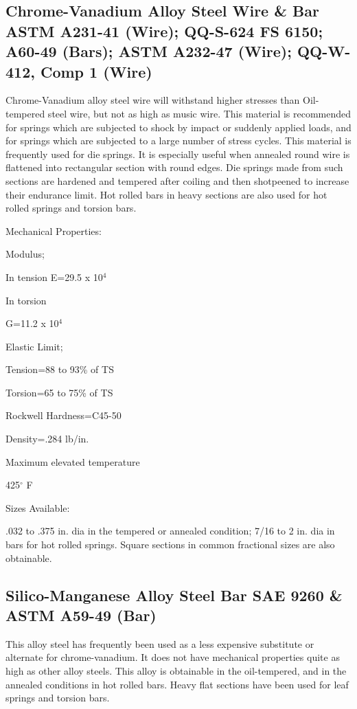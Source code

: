 \documentclass[10pt]{article}
\begin{document}
\subsection{Chrome-Vanadium Alloy Steel Wire \& Bar ASTM A231-41 (Wire); QQ-S-624 FS 6150; A60-49 (Bars); ASTM A232-47 (Wire); QQ-W-412, Comp 1 (Wire)} %

Chrome-Vanadium alloy steel wire will withstand higher stresses than Oil-tempered steel wire, but not as high as music wire. 
This material is recommended for springs which are subjected to shock by impact or suddenly applied loads, and for springs which are subjected to a large number of stress cycles. 
This material is frequently used for die springs. 
It is especially useful when annealed round wire is flattened into rectangular section with round edges. 
Die springs made from such sections are hardened and tempered after coiling and then shotpeened to increase their endurance limit. 
Hot rolled bars in heavy sections are also used for hot rolled springs and torsion bars.

Mechanical Properties:

Modulus;

In tension E=29.5 x 10$^4$

In torsion

G=11.2 x 10$^4$

Elastic Limit;

Tension=88 to 93\% of TS

Torsion=65 to 75\% of TS

Rockwell Hardness=C45-50

Density=.284 lb/in.

Maximum elevated temperature

425$^\circ$ F

Sizes Available:

.032 to .375 in. dia in the tempered or annealed condition; 7/16 to 2 in. dia in bars for hot rolled springs.
Square sections in common fractional sizes are also obtainable.

\subsection{Silico-Manganese Alloy Steel Bar SAE 9260 \& ASTM A59-49 (Bar)} %
This alloy steel has frequently been used as a less expensive substitute or alternate for chrome-vanadium. 
It does not have mechanical properties quite as high as other alloy steels. 
This alloy is obtainable in the oil-tempered, and in the annealed conditions in hot rolled bars. 
Heavy flat sections have been used for leaf springs and torsion bars.
\end{document}
